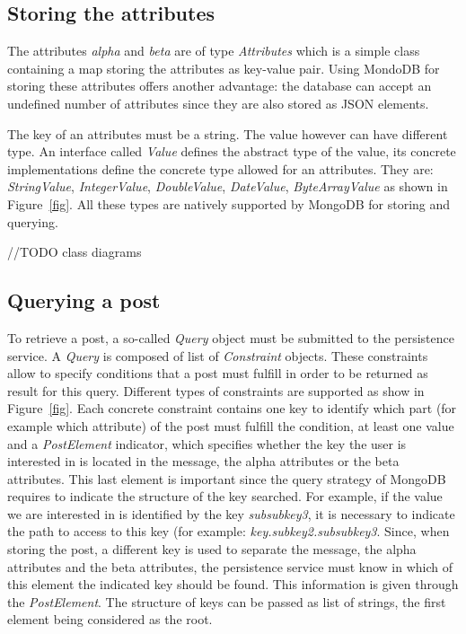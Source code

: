\documentclass[oneside]{scrreprt}
\newcommand{\fig}[1]{Figure~\ref{#1}}
\begin{document}
\subsection{Storing the attributes}

The attributes \emph{alpha} and \emph{beta} are of type \emph{Attributes} which is a simple class containing a map storing the attributes as key-value pair. Using MondoDB for storing these attributes offers another advantage: the database can accept an undefined number of attributes since they are also stored as JSON elements.

The key of an attributes must be a string. The value however can have different type. An interface called \emph{Value} defines the abstract type of the value, its concrete implementations define the concrete type allowed for an attributes. They are: \emph{StringValue}, \emph{IntegerValue}, \emph{DoubleValue}, \emph{DateValue}, \emph{ByteArrayValue} as shown in \fig{fig}. All these types are natively supported by MongoDB for storing and querying.

//TODO class diagrams

\subsection{Querying a post}

To retrieve a post, a so-called \emph{Query} object must be submitted to the persistence service. A \emph{Query} is composed of list of \emph{Constraint} objects. These constraints allow to specify conditions that a post must fulfill in order to be returned as result for this query. Different types of constraints are supported as show in \fig{fig}. Each concrete constraint contains one key to identify which part (for example which attribute) of the post must fulfill the condition, at least one value and a \emph{PostElement} indicator, which specifies whether the key the user is interested in is located in the message, the alpha attributes or the beta attributes. This last element is important since the query strategy of MongoDB requires to indicate the structure of the key searched. For example, if the value we are interested in is identified by the key \emph{subsubkey3}, it is necessary to indicate the path to access to this key (for example: \emph{key.subkey2.subsubkey3}. Since, when storing the post, a different key is used to separate the message, the alpha attributes and the beta attributes, the persistence service must know in which of this element the indicated key should be found. This information is given through the \emph{PostElement}. The structure of keys can be passed as list of strings, the first element being considered as the root.
\end{document}
